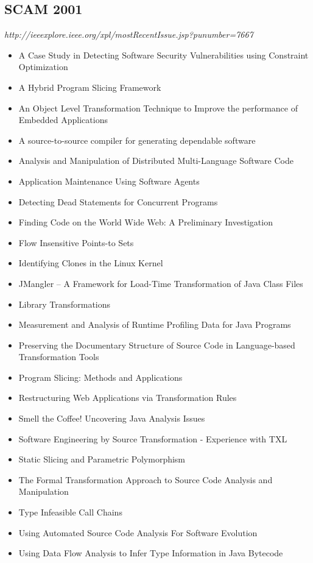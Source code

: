 \subsection{SCAM 2001}

{\small \em http://ieeexplore.ieee.org/xpl/mostRecentIssue.jsp?punumber=7667}

{\small
\begin{itemize}[itemsep=-1ex]
  \item A Case Study in Detecting Software Security Vulnerabilities using Constraint Optimization
  \item A Hybrid Program Slicing Framework
  \item An Object Level Transformation Technique to Improve the performance of Embedded Applications
  \item A source-to-source compiler for generating dependable software
  \item Analysis and Manipulation of Distributed Multi-Language Software Code
  \item Application Maintenance Using Software Agents
  \item Detecting Dead Statements for Concurrent Programs
  \item Finding Code on the World Wide Web: A Preliminary Investigation
  \item Flow Insensitive Points-to Sets
  \item Identifying Clones in the Linux Kernel {\color{blue} \checkmark}{\color{red} \texttimes}
  \item JMangler – A Framework for Load-Time Transformation of Java Class Files
  \item Library Transformations
  \item Measurement and Analysis of Runtime Profiling Data for Java Programs
  \item Preserving the Documentary Structure of Source Code in Language-based Transformation Tools {\color{blue} \checkmark}{\color{red} \texttimes}
  \item Program Slicing: Methods and Applications
  \item Restructuring Web Applications via Transformation Rules {\color{blue} \checkmark}{\color{red} \texttimes}
  \item Smell the Coffee! Uncovering Java Analysis Issues {\color{blue} \checkmark}{\color{red} \texttimes}
  \item Software Engineering by Source Transformation - Experience with TXL
  \item Static Slicing and Parametric Polymorphism
  \item The Formal Transformation Approach to Source Code Analysis and Manipulation
  \item Type Infeasible Call Chains
  \item Using Automated Source Code Analysis For Software Evolution {\color{blue} \checkmark}{\color{red} \texttimes}
  \item Using Data Flow Analysis to Infer Type Information in Java Bytecode {\color{blue} \checkmark}{\color{red} \texttimes}
\end{itemize}
}

